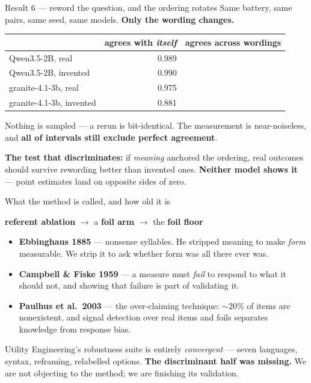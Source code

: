 \documentclass[aspectratio=169,11pt]{beamer}
\newcommand{\hl}[1]{\textcolor{accent}{\textbf{#1}}}
\begin{document}
\begin{frame}{Result 6 --- reword the question, and the ordering rotates}
  Same battery, same pairs, same seed, same models. \hl{Only the wording
  changes.}

  \bigskip
  \begin{center}
  \begin{tabular}{@{}lrr@{}}
    \toprule
     & agrees with \emph{itself} & agrees across wordings \\
    \midrule
    Qwen3.5-2B, real     & 0.989 & \hl{\VsQwenThreeFiveTwoBRCorr{}} \\
    Qwen3.5-2B, invented & 0.990 & \VsQwenThreeFiveTwoBNmCorr{} \\
    granite-4.1-3b, real     & 0.975 & \VsgraniteFourOneThreebRCorr{} \\
    granite-4.1-3b, invented & 0.881 & \VsgraniteFourOneThreebNmCorr{} \\
    \bottomrule
  \end{tabular}
  \end{center}

  \bigskip
  Nothing is sampled --- a rerun is bit-identical. The measurement is
  near-noiseless, and \hl{all \VsNRotating{} of \VsNCells{} intervals still
  exclude perfect agreement}.

  \bigskip
  \textbf{The test that discriminates:} if \emph{meaning} anchored the
  ordering, real outcomes should survive rewording better than invented ones.
  \hl{Neither model shows it} --- point estimates land on opposite sides of
  zero.
\end{frame}

\begin{frame}{What the method is called, and how old it is}
  \begin{center}
  \Large
  \hl{referent ablation} $\rightarrow$ a \hl{foil arm} $\rightarrow$ the
  \hl{foil floor}
  \end{center}

  \bigskip
  \begin{itemize}
    \item \textbf{Ebbinghaus 1885} --- nonsense syllables. He stripped meaning
      to make \emph{form} measurable. We strip it to ask whether form was all
      there ever was.
    \item \textbf{Campbell \& Fiske 1959} --- a measure must \emph{fail} to
      respond to what it should not, and showing that failure is part of
      validating it.
    \item \textbf{Paulhus et al.\ 2003} --- the over-claiming technique: $\sim$20\%
      of items are nonexistent, and signal detection over real items and foils
      separates knowledge from response bias.
  \end{itemize}

  \bigskip
  Utility Engineering's robustness suite is entirely \emph{convergent} ---
  seven languages, syntax, reframing, relabelled options. \hl{The discriminant
  half was missing.} We are not objecting to the method; we are finishing its
  validation.
\end{frame}
\end{document}
